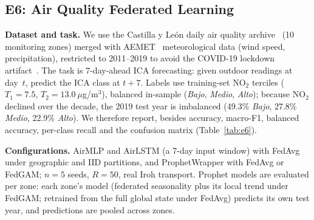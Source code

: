 \documentclass[a4paper,fleqn]{cas-dc}
\begin{document}
\subsection{E6: Air Quality Federated Learning}
\label{sec:e6}

\textbf{Dataset and task.} We use the Castilla y Le\'on daily air quality archive~\cite{cyl2023airquality} (10 monitoring zones) merged with AEMET~\cite{aemet2023} meteorological data (wind speed, precipitation), restricted to 2011--2019 to avoid the COVID-19 lockdown artifact~\cite{lopezblanco2024airquality}. The task is 7-day-ahead ICA forecasting: given outdoor readings at day~$t$, predict the ICA class at $t{+}7$. Labels use training-set NO$_2$ terciles ($T_1{=}7.5$, $T_2{=}13.0~\mu$g/m$^3$), balanced in-sample (\textit{Bajo}, \textit{Medio}, \textit{Alto}); because NO$_2$ declined over the decade, the 2019 test year is imbalanced (49.3\% \textit{Bajo}, 27.8\% \textit{Medio}, 22.9\% \textit{Alto}). We therefore report, besides accuracy, macro-F1, balanced accuracy, per-class recall and the confusion matrix (Table~\ref{tab:e6}).

\textbf{Configurations.} AirMLP and AirLSTM (a 7-day input window) with FedAvg under geographic and IID partitions, and ProphetWrapper with FedAvg or FedGAM; $n{=}5$ seeds, $R{=}50$, real Iroh transport. Prophet models are evaluated per zone: each zone's model (federated seasonality plus its local trend under FedGAM; retrained from the full global state under FedAvg) predicts its own test year, and predictions are pooled across zones.
\end{document}
